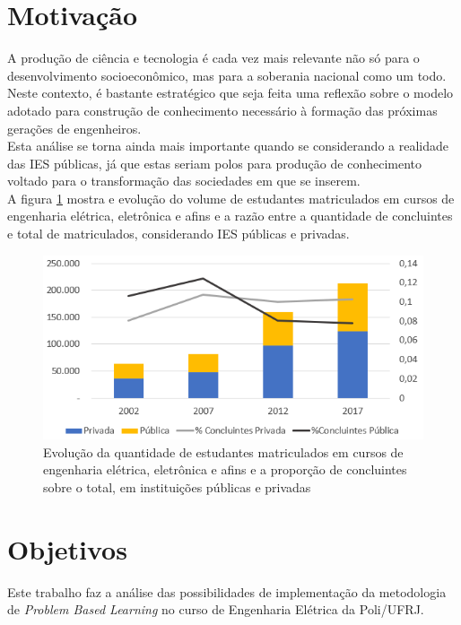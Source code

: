 	

	\section{Motivação}

		A produção de ciência e tecnologia é cada vez mais relevante não só para o desenvolvimento socioeconômico, mas para a soberania nacional como um todo. Neste contexto, é bastante estratégico que seja feita uma reflexão sobre o modelo adotado para construção de conhecimento necessário à formação das próximas gerações de engenheiros.\\
		
		Esta análise se torna ainda mais importante quando se considerando a realidade das IES públicas, já que estas seriam polos para produção de conhecimento voltado para o transformação das sociedades em que se inserem.\\
		
		A figura \ref{fig:evolucaomatriculadosconcluintes} mostra e evolução do volume de estudantes matriculados em cursos de engenharia elétrica, eletrônica e afins e a razão entre a quantidade de concluintes e total de matriculados, considerando IES públicas e privadas.
		
		\begin{figure}[h!]
			\centering
			\includegraphics[width=0.75\linewidth]{Figuras/evolucao_matriculados_concluintes}
			\caption[Evolução de matriculados em cursos de engenharia elétrica, eletrônica e afins]{Evolução da quantidade de estudantes matriculados em cursos de engenharia elétrica, eletrônica e afins e a proporção de concluintes sobre o total, em instituições públicas e privadas}
			\label{fig:evolucaomatriculadosconcluintes}
		\end{figure}
		
		
	\section{Objetivos}
	
		Este trabalho faz a análise das possibilidades de implementação da metodologia de \textit{Problem Based Learning} no curso de Engenharia Elétrica da Poli/UFRJ.
		

